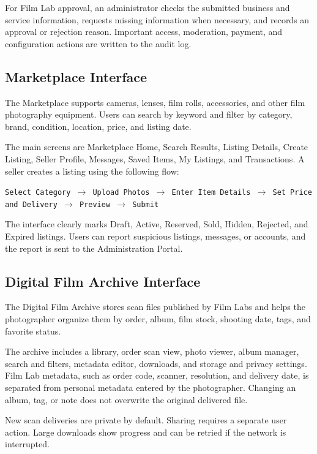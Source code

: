 For Film Lab approval, an administrator checks the submitted business and
service information, requests missing information when necessary, and records
an approval or rejection reason. Important access, moderation, payment, and
configuration actions are written to the audit log.

\subsection{Marketplace Interface}

The Marketplace supports cameras, lenses, film rolls, accessories, and other
film photography equipment. Users can search by keyword and filter by category,
brand, condition, location, price, and listing date.

The main screens are Marketplace Home, Search Results, Listing Details, Create
Listing, Seller Profile, Messages, Saved Items, My Listings, and Transactions.
A seller creates a listing using the following flow:

\begin{center}
\texttt{Select Category $\rightarrow$ Upload Photos $\rightarrow$
Enter Item Details $\rightarrow$ Set Price and Delivery
$\rightarrow$ Preview $\rightarrow$ Submit}
\end{center}

The interface clearly marks Draft, Active, Reserved, Sold, Hidden, Rejected,
and Expired listings. Users can report suspicious listings, messages, or
accounts, and the report is sent to the Administration Portal.

\subsection{Digital Film Archive Interface}

The Digital Film Archive stores scan files published by Film Labs and helps the
photographer organize them by order, album, film stock, shooting date, tags,
and favorite status.

The archive includes a library, order scan view, photo viewer, album manager,
search and filters, metadata editor, downloads, and storage and privacy
settings. Film Lab metadata, such as order code, scanner, resolution, and
delivery date, is separated from personal metadata entered by the photographer.
Changing an album, tag, or note does not overwrite the original delivered file.

New scan deliveries are private by default. Sharing requires a separate user
action. Large downloads show progress and can be retried if the network is
interrupted.

